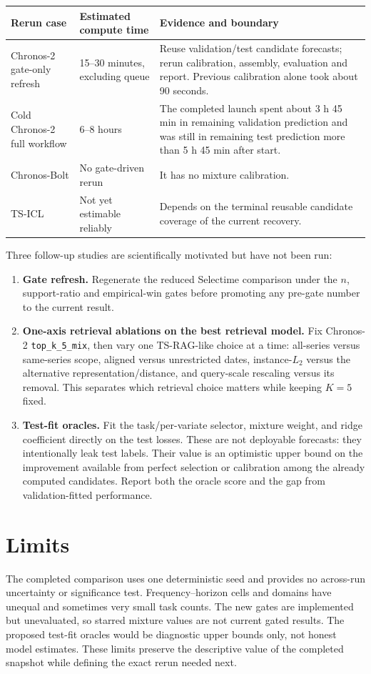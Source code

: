 \documentclass[10pt,a4paper]{article}
\begin{document}
\begin{center}
\small
\begin{tabularx}{\textwidth}{@{}p{36mm}p{39mm}X@{}}
\toprule
Rerun case & Estimated compute time & Evidence and boundary\\
\midrule
Chronos-2 gate-only refresh & 15--30 minutes, excluding queue & Reuse validation/test candidate forecasts; rerun calibration, assembly, evaluation and report. Previous calibration alone took about 90 seconds.\\
Cold Chronos-2 full workflow & 6--8 hours & The completed launch spent about 3 h 45 min in remaining validation prediction and was still in remaining test prediction more than 5 h 45 min after start.\\
Chronos-Bolt & No gate-driven rerun & It has no mixture calibration.\\
TS-ICL & Not yet estimable reliably & Depends on the terminal reusable candidate coverage of the current recovery.\\
\bottomrule
\end{tabularx}
\end{center}

Three follow-up studies are scientifically motivated but have not been run:

\begin{enumerate}
  \item \textbf{Gate refresh.} Regenerate the reduced Selectime comparison
  under the $n$, support-ratio and empirical-win gates before promoting any
  pre-gate number to the current result.
  \item \textbf{One-axis retrieval ablations on the best retrieval model.}
  Fix Chronos-2 \texttt{top\_k\_5\_mix}, then vary one TS-RAG-like choice at a
  time: all-series versus same-series scope, aligned versus unrestricted dates,
  instance-$L_2$ versus the alternative representation/distance, and
  query-scale rescaling versus its removal. This separates which retrieval
  choice matters while keeping $K=5$ fixed.
  \item \textbf{Test-fit oracles.} Fit the task/per-variate selector, mixture
  weight, and ridge coefficient directly on the test losses. These are not
  deployable forecasts: they intentionally leak test labels. Their value is an
  optimistic upper bound on the improvement available from perfect selection
  or calibration among the already computed candidates. Report both the oracle
  score and the gap from validation-fitted performance.
\end{enumerate}

\section{Limits}

The completed comparison uses one deterministic seed and provides no
across-run uncertainty or significance test. Frequency--horizon cells and
domains have unequal and sometimes very small task counts. The new gates are
implemented but unevaluated, so starred mixture values are not current gated
results. The proposed test-fit oracles would be diagnostic upper bounds only,
not honest model estimates. These limits preserve the descriptive value of the
completed snapshot while defining the exact rerun needed next.
\end{document}
